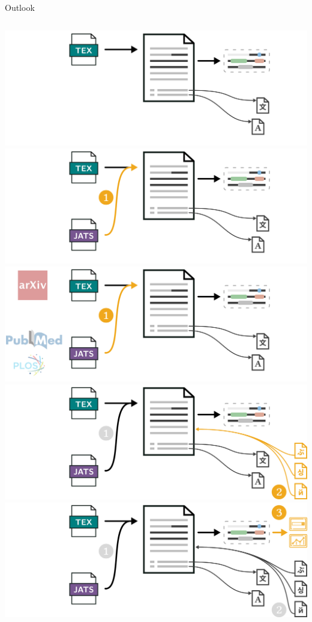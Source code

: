 \documentclass[en,16:9,smallfoot]{sdqbeamer}
\begin{document}
\begin{frame}[t]{Outlook}
\begin{columns}
          \begin{overprint}
               \includegraphics[width=\textwidth]{imgs/outlook_0}
               \includegraphics[width=\textwidth]{imgs/outlook_1}
               \includegraphics[width=\textwidth]{imgs/outlook_2}
               \includegraphics[width=\textwidth]{imgs/outlook_3}
               \includegraphics[width=\textwidth]{imgs/outlook_4}

\end{overprint}
\end{columns}
\end{frame}
\end{document}
